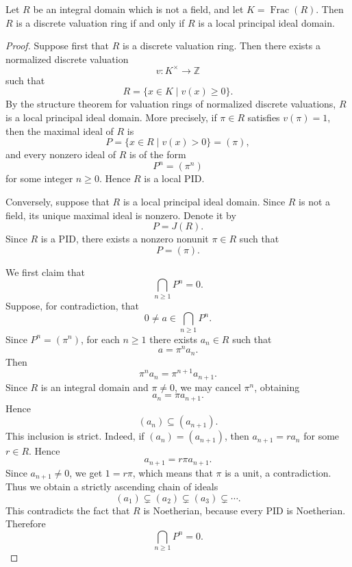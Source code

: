 \begin{theorem}
    Let \(R\) be an integral domain which is not a field, and let
    \(K=\operatorname{Frac}(R)\). Then \(R\) is a discrete valuation ring if and only if
    \(R\) is a local principal ideal domain.
\end{theorem}

\begin{proof}
    Suppose first that \(R\) is a discrete valuation ring. Then there exists a normalized
    discrete valuation
    \[
        v:K^\times\longrightarrow \mathbb{Z}
    \]
    such that
    \[
        R=\{x\in K\mid v(x)\geq 0\}.
    \]
    By the structure theorem for valuation rings of normalized discrete valuations, \(R\)
    is a local principal ideal domain. More precisely, if \(\pi\in R\) satisfies
    \(v(\pi)=1\), then the maximal ideal of \(R\) is
    \[
        P=\{x\in R\mid v(x)>0\}=(\pi),
    \]
    and every nonzero ideal of \(R\) is of the form
    \[
        P^n=(\pi^n)
    \]
    for some integer \(n\geq 0\). Hence \(R\) is a local PID.

    Conversely, suppose that \(R\) is a local principal ideal domain. Since \(R\) is not
    a field, its unique maximal ideal is nonzero. Denote it by
    \[
        P=J(R).
    \]
    Since \(R\) is a PID, there exists a nonzero nonunit \(\pi\in R\) such that
    \[
        P=(\pi).
    \]

    We first claim that
    \[
        \bigcap_{n\geq 1}P^n=0.
    \]
    Suppose, for contradiction, that
    \[
        0\neq a\in \bigcap_{n\geq 1}P^n.
    \]
    Since \(P^n=(\pi^n)\), for each \(n\geq 1\) there exists \(a_n\in R\) such that
    \[
        a=\pi^n a_n.
    \]
    Then
    \[
        \pi^n a_n=\pi^{n+1}a_{n+1}.
    \]
    Since \(R\) is an integral domain and \(\pi\neq 0\), we may cancel \(\pi^n\), obtaining
    \[
        a_n=\pi a_{n+1}.
    \]
    Hence
    \[
        (a_n)\subseteq (a_{n+1}).
    \]
    This inclusion is strict. Indeed, if \((a_n)=(a_{n+1})\), then
    \(a_{n+1}=r a_n\) for some \(r\in R\). Hence
    \[
        a_{n+1}=r\pi a_{n+1}.
    \]
    Since \(a_{n+1}\neq 0\), we get \(1=r\pi\), which means that \(\pi\) is a unit, a
    contradiction. Thus we obtain a strictly ascending chain of ideals
    \[
        (a_1)\subsetneq (a_2)\subsetneq (a_3)\subsetneq\cdots.
    \]
    This contradicts the fact that \(R\) is Noetherian, because every PID is Noetherian.
    Therefore
    \[
        \bigcap_{n\geq 1}P^n=0.
    \]


\end{proof}
